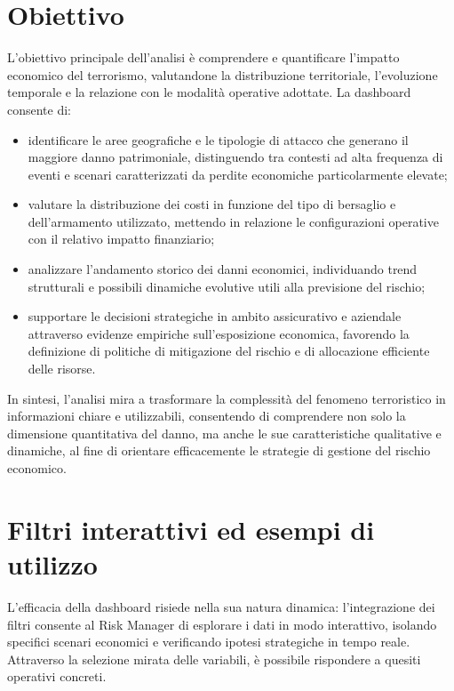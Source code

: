 \section{Obiettivo}

L’obiettivo principale dell’analisi è comprendere e quantificare l’impatto economico del terrorismo, valutandone la distribuzione territoriale, l’evoluzione temporale e la relazione con le modalità operative adottate. La dashboard consente di:

\begin{itemize}
    \item identificare le aree geografiche e le tipologie di attacco che generano il maggiore danno patrimoniale, distinguendo tra contesti ad alta frequenza di eventi e scenari caratterizzati da perdite economiche particolarmente elevate;

    \item valutare la distribuzione dei costi in funzione del tipo di bersaglio e dell’armamento utilizzato, mettendo in relazione le configurazioni operative con il relativo impatto finanziario;

    \item analizzare l’andamento storico dei danni economici, individuando trend strutturali e possibili dinamiche evolutive utili alla previsione del rischio;

    \item supportare le decisioni strategiche in ambito assicurativo e aziendale attraverso evidenze empiriche sull’esposizione economica, favorendo la definizione di politiche di mitigazione del rischio e di allocazione efficiente delle risorse.
\end{itemize}
In sintesi, l’analisi mira a trasformare la complessità del fenomeno terroristico in informazioni chiare e utilizzabili, consentendo di comprendere non solo la dimensione quantitativa del danno, ma anche le sue caratteristiche qualitative e dinamiche, al fine di orientare efficacemente le strategie di gestione del rischio economico.

\section{Filtri interattivi ed esempi di utilizzo}

L’efficacia della dashboard risiede nella sua natura dinamica: l’integrazione dei filtri consente al Risk Manager di esplorare i dati in modo interattivo, isolando specifici scenari economici e verificando ipotesi strategiche in tempo reale. Attraverso la selezione mirata delle variabili, è possibile rispondere a quesiti operativi concreti.

